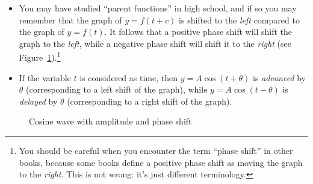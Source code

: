 \begin{rem} 
\begin{itemize}
\item
You may have studied ``parent functions'' in high school, and if so you may remember that the graph of $y = f(t+c)$ is shifted to the \emph{left} compared to the graph of $y = f(t)$.  It follows that a positive phase shift will shift the graph to the \emph{left}, while a negative phase shift will shift it to the \emph{right} (see Figure~\ref{fig:complex:2}).\footnote{ You should be careful when you encounter the term ``phase shift'' in other books, because some books define a positive phase shift as moving the graph to the \emph{right}. This is not wrong: it's just different terminology.}
\item 
If the variable $t$ is considered as time, then $y = A  \cos ( t + \theta) $ is \emph{advanced} by $\theta$ (corresponding to a left shift of the graph), while $y = A  \cos ( t - \theta) $ is \emph{delayed} by $\theta$ (corresponding to a right shift of the graph).  
\end{itemize}
\end{rem}
 
\begin{figure}[htb]
	  \caption{\label{fig:complex:2} Cosine wave with amplitude and phase shift}
\end{figure}

